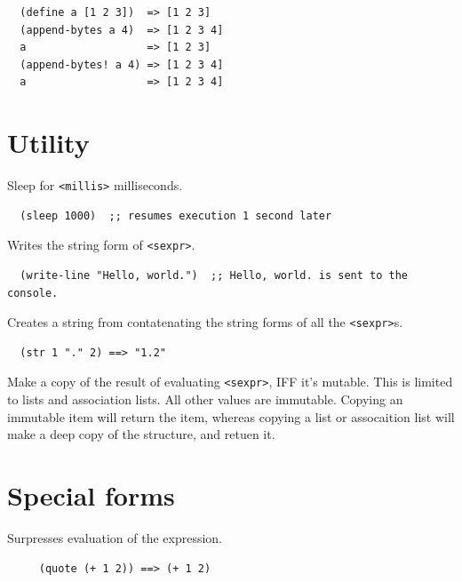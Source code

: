 \documentclass[12pt]{article}
\begin{document}
\begin{verbatim}
  (define a [1 2 3])  => [1 2 3]
  (append-bytes a 4)  => [1 2 3 4]
  a                   => [1 2 3]
  (append-bytes! a 4) => [1 2 3 4]
  a                   => [1 2 3 4]
\end{verbatim}

\section{Utility}


Sleep for \verb|<millis>| milliseconds.

\begin{verbatim}
  (sleep 1000)  ;; resumes execution 1 second later
\end{verbatim}


Writes the string form of \verb|<sexpr>|.

\begin{verbatim}
  (write-line "Hello, world.")  ;; Hello, world. is sent to the console.
\end{verbatim}


Creates a string from contatenating the string forms of all the \verb|<sexpr>|s.

\begin{verbatim}
  (str 1 "." 2) ==> "1.2"
\end{verbatim}


Make a copy of the result of evaluating \verb|<sexpr>|, IFF it's
mutable. This is limited to lists and association lists. All other
values are immutable. Copying an immutable item will return the item,
whereas copying a list or assocaition list will make a deep copy of
the structure, and retuen it.

\section{Special forms}


Surpresses evaluation of the expression.

\begin{verbatim}
     (quote (+ 1 2)) ==> (+ 1 2)
\end{verbatim}
\end{document}
